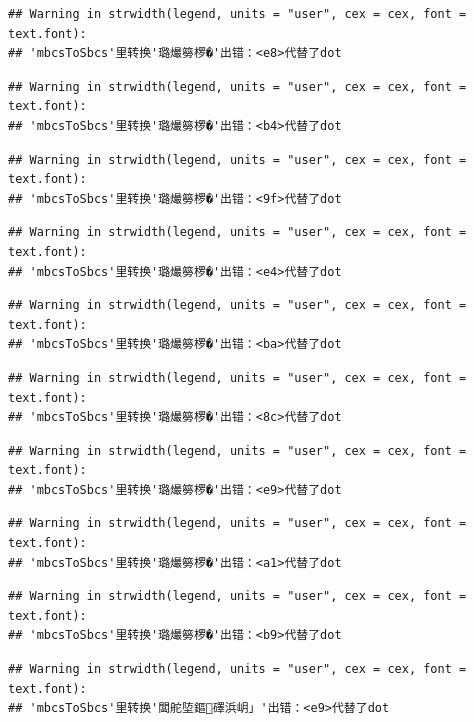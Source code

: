 \documentclass[
]{book}
\begin{document}
\begin{verbatim}
## Warning in strwidth(legend, units = "user", cex = cex, font = text.font):
## 'mbcsToSbcs'里转换'璐熶簩椤�'出错：<e8>代替了dot
\end{verbatim}

\begin{verbatim}
## Warning in strwidth(legend, units = "user", cex = cex, font = text.font):
## 'mbcsToSbcs'里转换'璐熶簩椤�'出错：<b4>代替了dot
\end{verbatim}

\begin{verbatim}
## Warning in strwidth(legend, units = "user", cex = cex, font = text.font):
## 'mbcsToSbcs'里转换'璐熶簩椤�'出错：<9f>代替了dot
\end{verbatim}

\begin{verbatim}
## Warning in strwidth(legend, units = "user", cex = cex, font = text.font):
## 'mbcsToSbcs'里转换'璐熶簩椤�'出错：<e4>代替了dot
\end{verbatim}

\begin{verbatim}
## Warning in strwidth(legend, units = "user", cex = cex, font = text.font):
## 'mbcsToSbcs'里转换'璐熶簩椤�'出错：<ba>代替了dot
\end{verbatim}

\begin{verbatim}
## Warning in strwidth(legend, units = "user", cex = cex, font = text.font):
## 'mbcsToSbcs'里转换'璐熶簩椤�'出错：<8c>代替了dot
\end{verbatim}

\begin{verbatim}
## Warning in strwidth(legend, units = "user", cex = cex, font = text.font):
## 'mbcsToSbcs'里转换'璐熶簩椤�'出错：<e9>代替了dot
\end{verbatim}

\begin{verbatim}
## Warning in strwidth(legend, units = "user", cex = cex, font = text.font):
## 'mbcsToSbcs'里转换'璐熶簩椤�'出错：<a1>代替了dot
\end{verbatim}

\begin{verbatim}
## Warning in strwidth(legend, units = "user", cex = cex, font = text.font):
## 'mbcsToSbcs'里转换'璐熶簩椤�'出错：<b9>代替了dot
\end{verbatim}

\begin{verbatim}
## Warning in strwidth(legend, units = "user", cex = cex, font = text.font):
## 'mbcsToSbcs'里转换'闆舵埅鏂礋浜岄」'出错：<e9>代替了dot
\end{verbatim}
\end{document}
